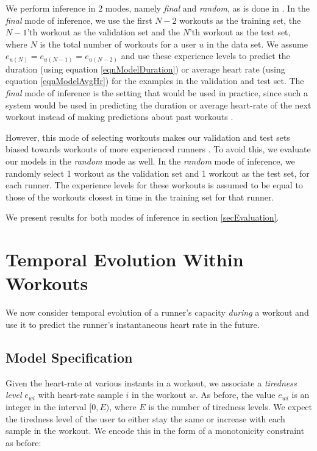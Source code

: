 \documentclass{acm_proc_article-sp}
\begin{document}
We perform inference in 2 modes, namely \emph{final} and \emph{random}, as is done in \cite{www13}. In the \emph{final} mode of inference, we use the first $N-2$ workouts as the training set, the $N-1$'th workout as the validation set and the $N$'th workout as the test set, where $N$ is the total number of workouts for a user $u$ in the data set. We assume $e_{u(N)} = e_{u(N-1)} = e_{u(N-2)}$ and use these experience levels to predict the duration (using equation \ref{eqnModelDuration}) or average heart rate (using equation \ref{eqnModelAvgHr}) for the examples in the validation and test set. The \emph{final} mode of inference is the setting that would be used in practice, since such a system would be used in predicting the duration or average heart-rate of the next workout instead of making predictions about past workouts \cite{www13}.

However, this mode of selecting workouts makes our validation and test sets biased towards workouts of more experienced runners \cite{www13}. To avoid this, we evaluate our models in the \emph{random} mode as well. In the \emph{random} mode of inference, we randomly select 1 workout as the validation set and 1 workout as the test set, for each runner. The experience levels for these workouts is assumed to be equal to those of the workouts closest in time in the training set for that runner. 

We present results for both modes of inference in section \ref{secEvaluation}.

\section{Temporal Evolution Within \\ Workouts}
\label{secTemporalModelWorkouts}
We now consider temporal evolution of a runner's capacity \emph{during} a workout and use it to predict the runner's instantaneous heart rate in the future. 

\subsection{Model Specification}

Given the heart-rate at various instants in a workout, we associate a \emph{tiredness level} $e_{wi}$ with heart-rate sample $i$ in the workout $w$. As before, the value $e_{wi}$ is an integer in the interval $[0, E)$, where $E$ is the number of tiredness levels. We expect the tiredness level of the user to either stay the same or increase with each sample in the workout. We encode this in the form of a monotonicity constraint as before:
\end{document}
